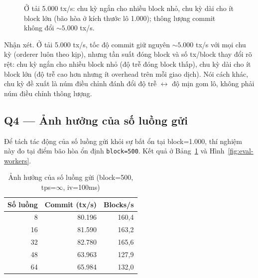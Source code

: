 \begin{figure}[H]
\centering
{}
\caption{Ở tải 5.000 tx/s: chu kỳ ngắn cho nhiều block nhỏ, chu kỳ dài cho ít
block lớn (bão hòa ở kích thước lô 1.000); thông lượng commit không đổi ${\sim}5.000$ tx/s.}
\label{fig:eval-interval}
\end{figure}

Nhận xét. Ở tải 5.000 tx/s, tốc độ commit giữ nguyên ${\sim}5.000$ tx/s
với mọi chu kỳ (orderer luôn theo kịp), nhưng tần suất đóng block và số
tx/block thay đổi rõ rệt: chu kỳ ngắn cho nhiều block nhỏ (độ trễ đóng block
thấp), chu kỳ dài cho ít block lớn (độ trễ cao hơn nhưng ít overhead trên mỗi
giao dịch). Nói cách khác, chu kỳ đề xuất là núm điều chỉnh đánh đổi độ
trễ $\leftrightarrow$ độ mịn gom lô, không phải núm điều chỉnh thông lượng.

\subsection{Q4 --- Ảnh hưởng của số luồng gửi}
\label{sec:eval-workers}

Để tách tác động của số luồng gửi khỏi sự bất ổn tại block=1.000, thí nghiệm này
đo tại điểm bão hòa ổn định \texttt{block=500}. Kết quả ở
Bảng~\ref{tab:eval-workers} và Hình~\ref{fig:eval-workers}.

\begin{table}[H]
\centering
\caption{Ảnh hưởng của số luồng gửi (block=500, tps=$\infty$, iv=100ms)}
\label{tab:eval-workers}
\begin{tabular}{@{}rrr@{}}
\toprule
\textbf{Số luồng} & \textbf{Commit (tx/s)} & \textbf{Blocks/s} \\
\midrule
8  & 80.196 & 160,4 \\
16 & 81.590 & 163,2 \\
32 & 82.780 & 165,6 \\
48 & 63.963 & 127,9 \\
64 & 65.984 & 132,0 \\
\bottomrule
\end{tabular}
\end{table}

